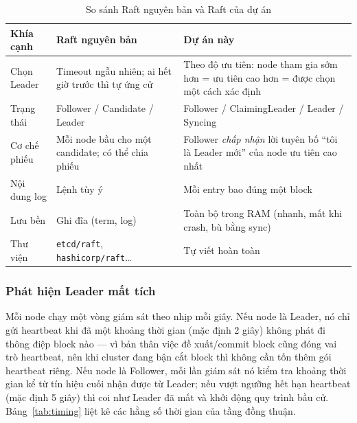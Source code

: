 \begin{table}[H]
\centering
\caption{So sánh Raft nguyên bản và Raft của dự án}
\label{tab:raft-vs-standard}
\begin{tabular}{@{}p{2.6cm}p{4.4cm}p{4.4cm}@{}}
\toprule
\textbf{Khía cạnh} & \textbf{Raft nguyên bản} & \textbf{Dự án này} \\
\midrule
Chọn Leader & Timeout ngẫu nhiên; ai hết giờ trước thì tự ứng cử & Theo độ ưu tiên: node tham gia sớm hơn = ưu tiên cao hơn = được chọn một cách xác định \\
Trạng thái & Follower / Candidate / Leader & Follower / ClaimingLeader / Leader / Syncing \\
Cơ chế phiếu & Mỗi node bầu cho một candidate; có thể chia phiếu & Follower \textit{chấp nhận} lời tuyên bố ``tôi là Leader mới'' của node ưu tiên cao nhất \\
Nội dung log & Lệnh tùy ý & Mỗi entry bao đúng một block \\
Lưu bền & Ghi đĩa (term, log) & Toàn bộ trong RAM (nhanh, mất khi crash, bù bằng sync) \\
Thư viện & \texttt{etcd/raft}, \texttt{hashicorp/raft}\dots & Tự viết hoàn toàn \\
\bottomrule
\end{tabular}
\end{table}

\subsubsection{Phát hiện Leader mất tích}

Mỗi node chạy một vòng giám sát theo nhịp mỗi giây. Nếu node là Leader, nó chỉ gửi
heartbeat khi đã một khoảng thời gian (mặc định 2 giây) không phát đi thông điệp
block nào --- vì bản thân việc đề xuất/commit block cũng đóng vai trò heartbeat,
nên khi cluster đang bận cắt block thì không cần tốn thêm gói heartbeat riêng. Nếu
node là Follower, mỗi lần giám sát nó kiểm tra khoảng thời gian kể từ tín hiệu cuối
nhận được từ Leader; nếu vượt ngưỡng hết hạn heartbeat (mặc định 5 giây) thì coi
như Leader đã mất và khởi động quy trình bầu cử. Bảng~\ref{tab:timing} liệt kê các
hằng số thời gian của tầng đồng thuận.

